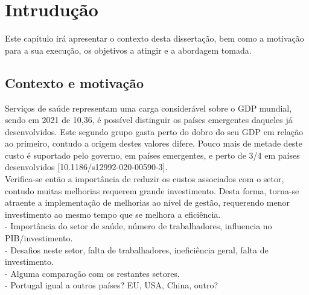 
%

\chapter{Intrudução}
\label{cha:intrudução}


\epigraphfontsize{\small\itshape}
\setlength\epigraphwidth{12.5cm}
\setlength\epigraphrule{0pt}

Este capítulo irá apresentar o contexto desta dissertação, bem como a motivação para a sua execução, os objetivos a atingir e a abordagem tomada.


\section{Contexto e motivação}
\label{sec:contexto_e_motivação}

Serviços de saúde representam uma carga considerável sobre o GDP mundial, sendo em 2021 de 10,36, é possível distinguir os países emergentes daqueles já desenvolvidos. Este segundo grupo gasta perto do dobro do seu GDP em relação ao primeiro, contudo a origem destes valores difere. Pouco mais de metade deste custo é suportado pelo governo, em países emergentes, e perto de 3/4 em países desenvolvidos [10.1186/s12992-020-00590-3].\\
Verifica-se então a importância de reduzir os custos associados com o setor, contudo muitas melhorias requerem grande investimento. Desta forma, torna-se atraente a implementação de melhorias ao nível de gestão, requerendo menor investimento ao mesmo tempo que se melhora a eficiência.\\


- Importância do setor de saúde, número de trabalhadores, influencia no PIB/investimento.\\
- Desafios neste setor, falta de trabalhadores, ineficiência geral, falta de investimento.\\
- Alguma comparação com os restantes setores.\\
- Portugal igual a outros países? EU, USA, China, outro?\\

